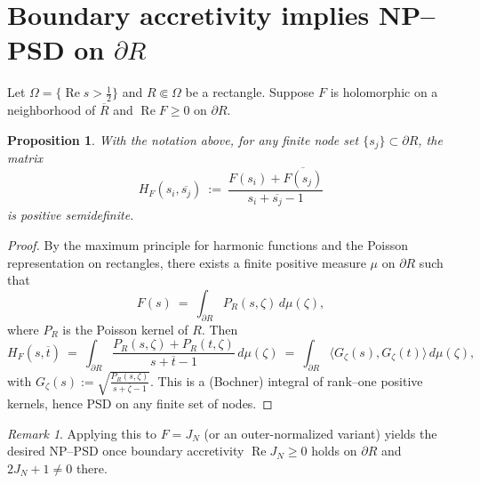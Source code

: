 \documentclass[11pt]{article}
\newtheorem{proposition}{Proposition}
\theoremstyle{remark}
\newtheorem{remark}{Remark}
\newcommand{\ReS}{\operatorname{Re}}
\begin{document}
\section*{Boundary accretivity implies NP--PSD on $\partial R$}

Let $\Omega=\{\ReS s>\tfrac12\}$ and $R\Subset\Omega$ be a rectangle. Suppose $F$ is holomorphic on a neighborhood of $\overline R$ and $\ReS F\ge0$ on $\partial R$.

\begin{proposition}\label{prop:accretivity_psd}
With the notation above, for any finite node set $\{s_j\}\subset\partial R$, the matrix
\[
H_F(s_i,\overline{s_j})\ :=\ \frac{F(s_i)+\overline{F(s_j)}}{s_i+\overline{s_j}-1}
\]
is positive semidefinite.
\end{proposition}

\begin{proof}
By the maximum principle for harmonic functions and the Poisson representation on rectangles, there exists a finite positive measure $\mu$ on $\partial R$ such that
\[
F(s)\ =\ \int_{\partial R} P_R(s,\zeta)\, d\mu(\zeta),
\]
where $P_R$ is the Poisson kernel of $R$. Then
\[
H_F(s,\overline t)
\ =\ \int_{\partial R} \frac{P_R(s,\zeta)+P_R(t,\zeta)}{s+\overline t-1}\, d\mu(\zeta)
\ =\ \int_{\partial R} \langle G_\zeta(s), G_\zeta(t)\rangle\, d\mu(\zeta),
\]
with $G_\zeta(s):=\sqrt{\tfrac{P_R(s,\zeta)}{s+\overline{\zeta}-1}}$. This is a (Bochner) integral of rank--one positive kernels, hence PSD on any finite set of nodes.
\end{proof}

\begin{remark}
Applying this to $F=J_N$ (or an outer-normalized variant) yields the desired NP--PSD once boundary accretivity $\ReS J_N\ge0$ holds on $\partial R$ and $2J_N+1\ne0$ there.
\end{remark}
\end{document}
